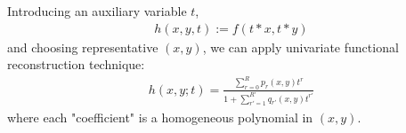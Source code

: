 \documentclass[10pt]{article}
\begin{document}
Introducing an auxiliary variable $t$,
\begin{eqnarray*}
h(x,y,t) := f(t*x, t*y)
\end{eqnarray*}
and choosing representative $(x,y)$, we can apply univariate functional reconstruction technique:
\begin{eqnarray*}
h(x,y;t) = \frac{\sum_{r=0}^R p_r(x,y) t^r}{1+ \sum_{r'=1}^{R'} q_{r'}(x,y) t^{r'}}
\end{eqnarray*}
where each "coefficient" is a homogeneous polynomial in $(x,y)$.
\end{document}
